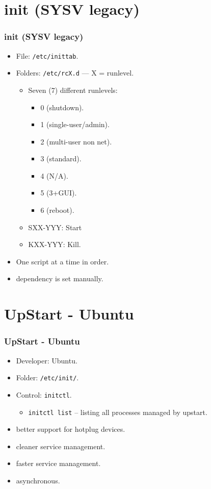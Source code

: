 \documentclass[aspectratio=169, xcolor=table, notheorems, hyperref={pdfpagelabels=false}]{beamer}
\begin{document}
\section{init (SYSV legacy)}
\begin{frame}
\frametitle{init (SYSV legacy)}
\begin{itemize}
\item File: \texttt{/etc/inittab}.
\item Folders: \texttt{/etc/rcX.d} --- X = runlevel.
\begin{itemize}
\item Seven (7) different runlevels: 
\begin{itemize}
\item 0 (shutdown).
\item 1 (single-user/admin).
\item 2 (multi-user non net).
\item 3 (standard).
\item 4 (N/A).
\item 5 (3+GUI).
\item 6 (reboot).
\end{itemize}
\item SXX-YYY: Start
\item KXX-YYY: Kill.
\end{itemize}
\item One script at a time in order.
\item dependency is set manually.
\end{itemize}
\end{frame}

\section{UpStart - Ubuntu}
\begin{frame}
\frametitle{UpStart - Ubuntu}
\begin{itemize}
\item Developer: Ubuntu.
\item Folder: \texttt{/etc/init/}.
\item Control: \texttt{initctl}.
\begin{itemize}
\item \texttt{initctl list} -- listing all processes managed by upstart.
\end{itemize}
\item better support for hotplug devices.
\item cleaner service management.
\item faster service management.
\item asynchronous.
\end{itemize}
\end{frame}
\end{document}
